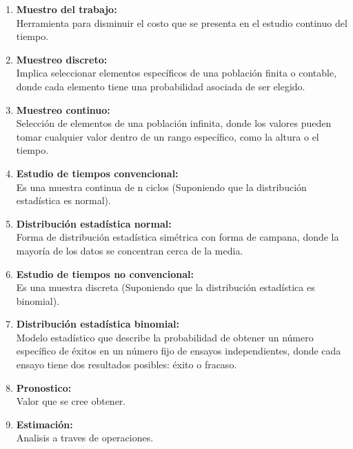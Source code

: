 \begin{enumerate}
\item \textbf{Muestro del trabajo: }
    \\Herramienta para disminuir el costo que se presenta en el estudio continuo del tiempo.
    \\ \cite{DiapositivasSema-4-04}

\item \textbf{Muestreo discreto: }
    \\Implica seleccionar elementos específicos de una población finita o contable, donde cada elemento tiene una probabilidad asociada de ser elegido.
    
\item \textbf{Muestreo continuo: }
    \\Selección de elementos de una población infinita, donde los valores pueden tomar cualquier valor dentro de un rango específico, como la altura o el tiempo.

\item \textbf{Estudio de tiempos convencional: }
    \\Es una muestra continua de n ciclos (Suponiendo que la distribución estadística es normal).
    \\ \cite{DiapositivasSema-4-04}

\item \textbf{Distribución estadística normal: }
    \\Forma de distribución estadística simétrica con forma de campana, donde la mayoría de los datos se concentran cerca de la media.

\item \textbf{Estudio de tiempos no convencional: }
    \\Es una muestra discreta (Suponiendo que la distribución estadística es binomial).
    \\ \cite{DiapositivasSema-4-04}

\item \textbf{Distribución estadística binomial: }
    \\Modelo estadístico que describe la probabilidad de obtener un número específico de éxitos en un número fijo de ensayos independientes, donde cada ensayo tiene dos resultados posibles: éxito o fracaso.

\item \textbf{Pronostico: }
    \\Valor que se cree obtener.
    
\item \textbf{Estimación: }
    \\Analisis a traves de operaciones.

\end{enumerate}

